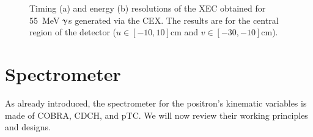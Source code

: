\begin{refsection}
        \begin{figure}[]   
            \centering
            \hfill
            \caption[XEC: resolutions]{Timing (a) and energy (b) resolutions of the XEC obtained for \SI{55}{MeV} $\upgamma$s generated via the CEX. The results are for the central region of the detector ($u\in[-10,10]$cm and $v\in[-30,-10]$cm).}
            \label{fig:MEC:XEC:resolution}
        \end{figure}

\section{Spectrometer}
    As already introduced, the spectrometer for the positron's kinematic variables is made of COBRA, CDCH, and pTC.
    We will now review their working principles and designs.


\end{refsection}
